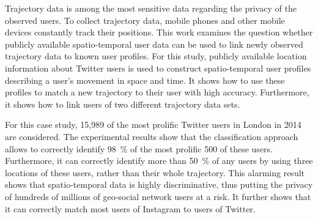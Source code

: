 \documentclass[11 pt]{report}
\begin{document}

\tableofcontents

\listoftables

\listoffigures

\abstractpage
Trajectory data is among the most sensitive data regarding the privacy of the observed users. To collect trajectory data, mobile phones and other mobile devices constantly track their positions. This work examines the question whether publicly available spatio-temporal user data can be used to link newly observed trajectory data to known user profiles. For this study, publicly available location information about Twitter users is used to construct spatio-temporal user profiles describing a user's movement in space and time. It shows how to use these profiles to match a new trajectory to their user with high accuracy. Furthermore, it shows how to link users of two different trajectory data sets.

For this case study, 15,989 of the most prolific Twitter users in London in 2014 are considered. The experimental results show that the classification approach allows to correctly identify 98~\% of the most prolific 500 of these users. Furthermore, it can correctly identify more than 50~\% of any users by using three locations of these users, rather than their whole trajectory. This alarming result shows that spatio-temporal data is highly discriminative, thus putting the privacy of hundreds of millions of geo-social network users at a risk. It further shows that it can correctly match most users of Instagram to users of Twitter.
\clearpage



\startofchapters










\end{document}
